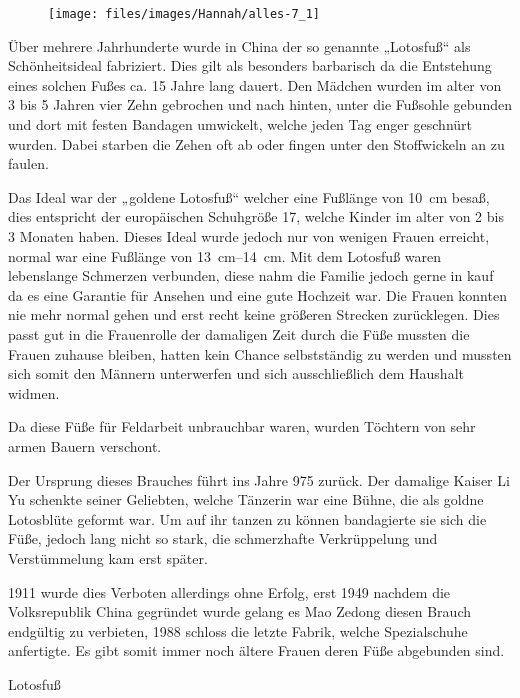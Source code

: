\begin{wrapfigure}{r}{0pt}
	\texttt{[image: files/images/Hannah/alles-7\_1]}%
\end{wrapfigure}
Über mehrere Jahrhunderte wurde in China der so genannte „Lotosfuß“ als Schönheitsideal fabriziert.
Dies gilt als besonders barbarisch da die Entstehung eines solchen Fußes ca. 15 Jahre lang dauert.
Den Mädchen wurden im alter von 3 bis 5 Jahren vier Zehn gebrochen und nach hinten, unter die
Fußsohle gebunden und dort mit festen Bandagen umwickelt, welche jeden Tag enger geschnürt wurden.
Dabei starben die Zehen oft ab oder fingen unter den Stoffwickeln an zu faulen.

Das Ideal war der „goldene Lotosfuß“ welcher eine Fußlänge von \SI{10}{\centi\metre} besaß, dies
entspricht der europäischen Schuhgröße 17, welche Kinder im alter von 2 bis 3 Monaten haben. Dieses
Ideal wurde jedoch nur von wenigen Frauen erreicht, normal war eine Fußlänge von
\SIrange{13}{14}{\centi\metre}. Mit dem Lotosfuß waren lebenslange Schmerzen verbunden, diese nahm
die Familie jedoch gerne in kauf da es eine Garantie für Ansehen und eine gute Hochzeit war. Die
Frauen konnten nie mehr normal gehen und erst recht keine größeren Strecken zurücklegen. Dies passt
gut in die Frauenrolle der damaligen Zeit durch die Füße mussten die Frauen zuhause bleiben, hatten
kein Chance selbstständig zu werden und mussten sich somit den Männern unterwerfen und sich
ausschließlich dem Haushalt widmen.

Da diese Füße für Feldarbeit unbrauchbar waren, wurden Töchtern von sehr armen Bauern verschont.

Der Ursprung dieses Brauches führt ins Jahre 975 zurück. Der damalige Kaiser Li Yu schenkte seiner
Geliebten, welche Tänzerin war eine Bühne, die als goldne Lotosblüte geformt war. Um auf ihr tanzen
zu können bandagierte sie sich die Füße, jedoch lang nicht so stark, die schmerzhafte Verkrüppelung
und Verstümmelung kam erst später.

1911 wurde dies Verboten allerdings ohne Erfolg, erst 1949 nachdem
die Volksrepublik China gegründet wurde gelang es Mao Zedong diesen Brauch endgültig zu verbieten,
1988 schloss die letzte Fabrik, welche Spezialschuhe anfertigte. Es gibt somit immer noch ältere
Frauen deren Füße abgebunden sind.

\begin{figurewrapper}
	 \hfill
	\caption{Lotosfuß}
\end{figurewrapper}



